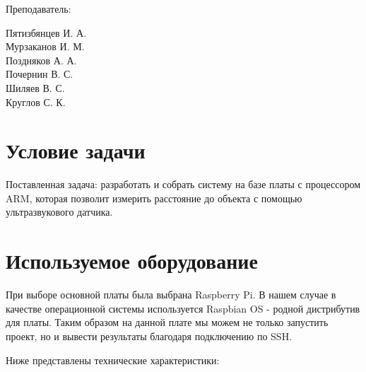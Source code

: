 \documentclass[a4paper, 14pt]{article}
\begin{document}
\begin{titlepage}
\begin{multicols}{2}
\begin{flushright}
			{Преподаватель:\\}

		\end{flushright}
		\begin{flushright}

			{Пятизбянцев И. А.}\\
			{Мурзаканов И. М.}\\
			{Поздняков А. А.}\\
			{Почернин В. С.}\\
			{Шиляев В. С.}\\[0.5cm]


			Круглов С. К.\\

		\end{flushright}
	\end{multicols}

	\flushright{
	{\phantom{qwe}}\\[1.5cm]
	{\today}\\
	}

	\vfill
\end{titlepage}

\Large
\tableofcontents
\newpage

\section{Условие задачи}

Поставленная задача: разработать и собрать систему на базе платы с процессором ARM, которая позволит измерить расстояние до объекта с помощью ультразвукового датчика.

\newpage
\section{Используемое оборудование}

При выборе основной платы была выбрана Raspberry Pi. В нашем случае в качестве операционной системы используется Raspbian OS - родной дистрибутив для платы. Таким образом на данной плате мы можем не только запустить проект, но и вывести результаты благодаря подключению по SSH.

Ниже представлены технические характеристики:
\end{document}
